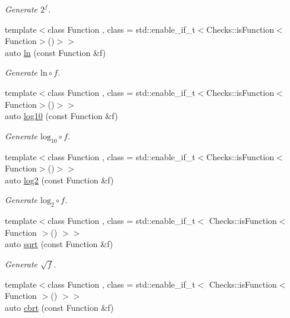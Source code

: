 \begin{DoxyCompactItemize}
\begin{DoxyCompactList}\small\item\em Generate $2^f$. \end{DoxyCompactList}\item 
{\footnotesize template$<$class Function , class  = std\-::enable\-\_\-if\-\_\-t$<$\-Checks\-::is\-Function$<$\-Function$>$()$>$$>$ }\\auto \hyperlink{group__CMathGroup_ga31313571b08f65b853643e14fc8fc714}{ln} (const Function \&f)
\begin{DoxyCompactList}\small\item\em Generate $ \mathrm{ln}\circ f $. \end{DoxyCompactList}\item 
{\footnotesize template$<$class Function , class  = std\-::enable\-\_\-if\-\_\-t$<$\-Checks\-::is\-Function$<$\-Function$>$()$>$$>$ }\\auto \hyperlink{group__CMathGroup_gae9506f4e0e6fad4f756f636044697bfe}{log10} (const Function \&f)
\begin{DoxyCompactList}\small\item\em Generate $ \mathrm{log}_{10}\circ f $. \end{DoxyCompactList}\item 
{\footnotesize template$<$class Function , class  = std\-::enable\-\_\-if\-\_\-t$<$\-Checks\-::is\-Function$<$\-Function$>$()$>$$>$ }\\auto \hyperlink{group__CMathGroup_gacd6be7e9de7bbd54c852f0acf0c7d2c2}{log2} (const Function \&f)
\begin{DoxyCompactList}\small\item\em Generate $ \mathrm{log}_{2}\circ f $. \end{DoxyCompactList}\item 
{\footnotesize template$<$class Function , class  = std\-::enable\-\_\-if\-\_\-t$<$ Checks\-::is\-Function$<$ Function $>$() $>$$>$ }\\auto \hyperlink{group__CMathGroup_ga136c890475e48f88469a737d95368d05}{sqrt} (const Function \&f)
\begin{DoxyCompactList}\small\item\em Generate $ \sqrt{f} $. \end{DoxyCompactList}\item 
{\footnotesize template$<$class Function , class  = std\-::enable\-\_\-if\-\_\-t$<$ Checks\-::is\-Function$<$ Function $>$() $>$$>$ }\\auto \hyperlink{group__CMathGroup_gaa7f2552adfb8ec41aeb685adddd8bf98}{cbrt} (const Function \&f)

\end{DoxyCompactItemize}
